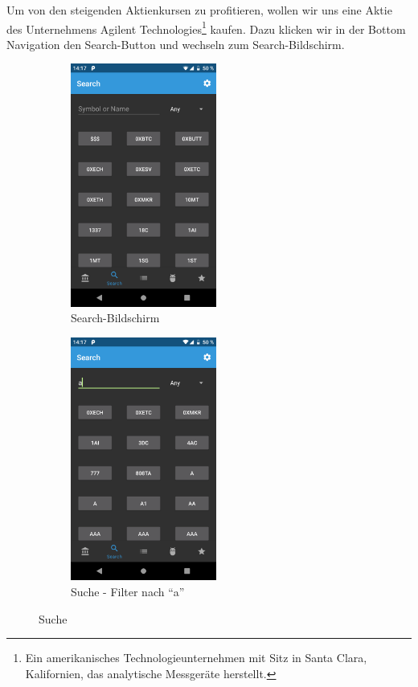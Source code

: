 \documentclass[a4paper]{article}
\begin{document}
 Um von den steigenden Aktienkursen zu profitieren, wollen wir uns eine Aktie des Unternehmens Agilent Technologies\footnote{Ein amerikanisches Technologieunternehmen mit Sitz in Santa Clara, Kalifornien, das analytische Messgeräte herstellt.} kaufen. Dazu klicken wir in der Bottom Navigation den Search-Button und wechseln zum Search-Bildschirm.

\begin{figure}[H]
	\begin{subfigure}{.5\textwidth}
		\centering
		\includegraphics[height=8cm,keepaspectratio]{./images/demo/search.png}
		\caption{Search-Bildschirm}
		\label{fig:demo:search_screen}
	\end{subfigure}
	\begin{subfigure}{.5\textwidth}
		\centering
		\includegraphics[height=8cm,keepaspectratio]{./images/demo/search_a.png}
		\caption{Suche - Filter nach "`a"'}
		\label{fig:demo:search_a}
	\end{subfigure}
	\caption{Suche}
	\label{fig:demo:search}
\end{figure}
\end{document}
